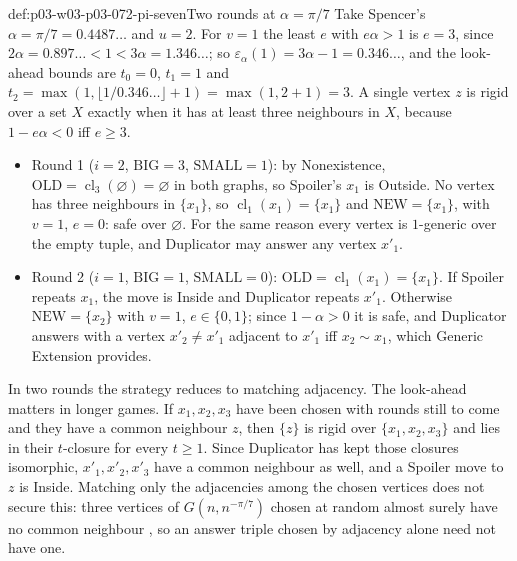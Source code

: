 \begin{hbexample}{def:p03-w03-p03-072-pi-seven}{Two rounds at \(\alpha=\pi/7\)}
Take Spencer's \(\alpha=\pi/7=0.4487\ldots\)
\cite[p.~7]{Spencer2007LogicRandomStructuresAuthor} and \(u=2\).  For
\(v=1\) the least \(e\) with \(e\alpha>1\) is \(e=3\), since
\(2\alpha=0.897\ldots<1<3\alpha=1.346\ldots\); so
\(\varepsilon_\alpha(1)=3\alpha-1=0.346\ldots\), and the look-ahead bounds
are \(t_0=0\), \(t_1=1\) and
\(t_2=\max(1,\lfloor1/0.346\ldots\rfloor+1)=\max(1,2+1)=3\).  A single vertex
\(z\) is rigid over a set \(X\) exactly when it has at least three
neighbours in \(X\), because \(1-e\alpha<0\) iff \(e\geq3\).
\begin{itemize}
\item Round 1 (\(i=2\), \(\mathrm{BIG}=3\), \(\mathrm{SMALL}=1\)): by
  Nonexistence, \(\mathrm{OLD}=\operatorname{cl}_3(\varnothing)=\varnothing\)
  in both graphs, so Spoiler's \(x_1\) is Outside.  No vertex has three
  neighbours in \(\{x_1\}\), so \(\operatorname{cl}_1(x_1)=\{x_1\}\) and
  \(\mathrm{NEW}=\{x_1\}\), with \(v=1\), \(e=0\): safe over
  \(\varnothing\).  For the same reason every vertex is \(1\)-generic over
  the empty tuple, and Duplicator may answer any vertex \(x'_1\).
\item Round 2 (\(i=1\), \(\mathrm{BIG}=1\), \(\mathrm{SMALL}=0\)):
  \(\mathrm{OLD}=\operatorname{cl}_1(x_1)=\{x_1\}\).  If Spoiler repeats
  \(x_1\), the move is Inside and Duplicator repeats \(x'_1\).  Otherwise
  \(\mathrm{NEW}=\{x_2\}\) with \(v=1\), \(e\in\{0,1\}\); since
  \(1-\alpha>0\) it is safe, and Duplicator answers with a vertex
  \(x'_2\neq x'_1\) adjacent to \(x'_1\) iff \(x_2\sim x_1\), which Generic
  Extension provides.
\end{itemize}
In two rounds the strategy reduces to matching adjacency.  The look-ahead
matters in longer games.  If \(x_1,x_2,x_3\) have been chosen with rounds
still to come and they have a common neighbour \(z\), then \(\{z\}\) is
rigid over \(\{x_1,x_2,x_3\}\) and lies in their \(t\)-closure for every
\(t\geq1\).  Since Duplicator has kept those closures isomorphic,
\(x'_1,x'_2,x'_3\) have a common neighbour as well, and a Spoiler move to
\(z\) is Inside.  Matching only the adjacencies among the chosen vertices
does not secure this: three vertices of \(G(n,n^{-\pi/7})\) chosen at random
almost surely have no common neighbour
\cite[pp.~7--8]{Spencer2007LogicRandomStructuresAuthor}, so an answer
triple chosen by adjacency alone need not have one.
\end{hbexample}

